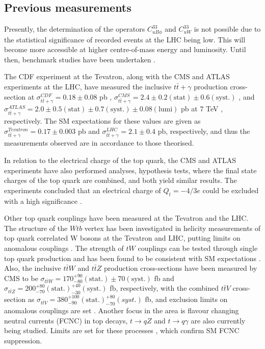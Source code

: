 \subsection{Previous measurements}

Presently, the determination of the operators $C^{33}_{uB\phi}$ and $C^{33}_{uW}$ is not possible due to the statistical significance of recorded events at the LHC being low. This will become more accessible at higher centre-of-mass energy and luminosity. Until then, benchmark studies have been undertaken \cite{photonbackgrounds}.

The CDF experiment at the Tevatron, along with the CMS and ATLAS experiments at the LHC, have measured the inclusive $t\bar{t}+\gamma$ production cross-section at $\sigma^{CDF}_{t\bar{t}+\gamma} = 0.18 \pm 0.08$ pb \cite{CDFttgamma}, $\sigma^{CMS}_{t\bar{t}+\gamma} = 2.4 \pm 0.2 (\text{stat}) \pm 0.6 (\text{syst.})$ \cite{CMS-PAS-TOP-13-011}, and $\sigma^{ATLAS}_{t\bar{t}+\gamma} = 2.0 \pm 0.5 (\text{stat}) \pm 0.7 (\text{syst.}) \pm 0.08 (\text{lumi})$ pb at 7 TeV \cite{ATLASttgamma}, respectively. The SM expectations for these values are given as $\sigma^{Tevatron}_{t\bar{t}+\gamma} = 0.17 \pm 0.003$ pb and $\sigma^{LHC}_{t\bar{t}+\gamma} = 2.1 \pm 0.4$ pb, respectively, and thus the measurements observed are in accordance to those theorised. 

In relation to the electrical charge of the top quark, the CMS and ATLAS experiments have also performed analyses, hypothesis tests, where the final state charges of the top quark are combined, and both yield similar results. The experiments concluded that an electrical charge of $Q_t = -4/3e$ could be excluded  with a high significance \cite{topchargeconstraints, ATLAStopcharge}.

Other top quark couplings have been measured at the Tevatron and the LHC. The structure of the $Wtb$ vertex has been investigated in 
helicity measurements of top quark correlated W bosons at the Tevatron and LHC, putting limits on anomalous couplings \cite{CDFD0combination, 
Whelicitytoppair, Wpolarisation}. The strength of $tW$ couplings can be tested through single top quark production and has been found to be 
consistent with SM expectations \cite{tsinglet, singlet}. Also, the inclusive $t\bar{t}W$ and $t\bar{t}Z$ production cross-sections have been 
measured by CMS to be $\sigma_{t\bar{t}W} = 170^{+90}_{-80}(\text{stat}.) \pm 70(\text{syst}.)$ fb and $\sigma_{t\bar{t}Z} = 200^{+80}_{-70}(\text{stat}.) ^{+40}_{-30}(\text{syst}.)$ fb, respectively, with the combined $t\bar{t}V$ cross-section as $\sigma_{t\bar{t}V} = 380^{+100}_{-90}
(\text{stat}.)^{+80}_{-70}(syst.) $ fb, and exclusion limits on anomalous couplings are set \cite{Khachatryan:1712680}. Another focus in the 
area is flavour changing neutral currents (FCNC) in top decays, $t \to qZ$ and $t \to q\gamma$ are also currently being studied. Limits are set 
for these processes \cite{tqZ, FCNC}, which confirm SM FCNC suppression. 

